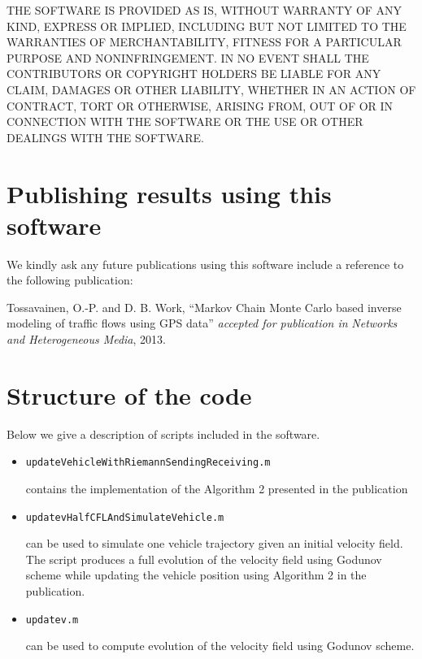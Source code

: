 \documentclass[english]{article}
\begin{document}
THE SOFTWARE IS PROVIDED \textquotedbl{}AS IS\textquotedbl{}, WITHOUT
WARRANTY OF ANY KIND, EXPRESS OR IMPLIED, INCLUDING BUT NOT LIMITED
TO THE WARRANTIES OF MERCHANTABILITY, FITNESS FOR A PARTICULAR PURPOSE
AND NONINFRINGEMENT. IN NO EVENT SHALL THE CONTRIBUTORS OR COPYRIGHT
HOLDERS BE LIABLE FOR ANY CLAIM, DAMAGES OR OTHER LIABILITY, WHETHER
IN AN ACTION OF CONTRACT, TORT OR OTHERWISE, ARISING FROM, OUT OF
OR IN CONNECTION WITH THE SOFTWARE OR THE USE OR OTHER DEALINGS WITH
THE SOFTWARE.


\section{Publishing results using this software}

We kindly ask any future publications using this software include
a reference to the following publication:

Tossavainen, O.-P. and D. B. Work, ``Markov Chain Monte Carlo based
inverse modeling of traffic flows using GPS data'' \emph{accepted
for publication in} \emph{Networks and Heterogeneous Media}, 2013.

\section{Structure of the code}
Below we give a description of scripts included in the software.
\begin{itemize}
\item \begin{verbatim}updateVehicleWithRiemannSendingReceiving.m\end{verbatim} 
contains the implementation of the Algorithm 2 presented in the publication  

\item \begin{verbatim}updatevHalfCFLAndSimulateVehicle.m\end{verbatim} can be used to 
simulate one vehicle trajectory given an initial velocity field. The script produces a full evolution of the
velocity field using Godunov scheme while updating the vehicle position using Algorithm 2 in the publication.

\item \begin{verbatim}updatev.m\end{verbatim} can be used to compute evolution of the velocity field using Godunov scheme.

\end{itemize}
\end{document}
